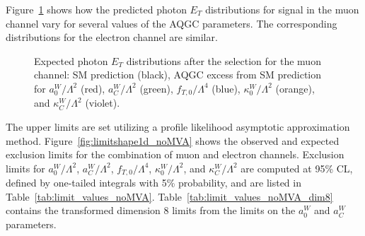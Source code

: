 Figure~\ref{fig:limitinput} shows how the predicted photon $E_T$ distributions for signal in the muon channel vary
for several values of the AQGC parameters. The corresponding distributions for the electron channel are similar.


\begin{figure}[b]
  \begin{center}
    \caption{ Expected photon $E_T$ distributions after the selection for the muon channel: SM prediction (black), AQGC excess from SM
prediction for $a_{0}^{W}/\Lambda^{2}$ (red), $a_{C}^{W}/\Lambda^{2}$ (green), $f_{T,0}/\Lambda^{4}$ (blue),
$\kappa_{0}^{W}/\Lambda^{2}$ (orange), and $\kappa_{C}^{W}/\Lambda^{2}$ (violet).}
    \label{fig:limitinput}
  \end{center} \end{figure}

The upper limits are set utilizing a profile likelihood asymptotic approximation method. 
Figure~\ref{fig:limitshape1d_noMVA} shows the observed and expected exclusion limits for the 
combination of muon and electron channels. Exclusion limits for
$a_{0}^{W}/\Lambda^{2}$, $a_{C}^{W}/\Lambda^{2}$,
$f_{T,0}/\Lambda^{4}$, $\kappa_{0}^{W}/\Lambda^{2}$, and
$\kappa_{C}^{W}/\Lambda^{2}$ are computed at 95\% CL, 
defined by one-tailed integrals with 5\% 
probability, and are listed in Table~\ref{tab:limit_values_noMVA}. 
Table~\ref{tab:limit_values_noMVA_dim8} contains the transformed
dimension 8 limits from the limits on the $a_{0}^{W}$ and $a_{C}^{W}$ parameters. 

